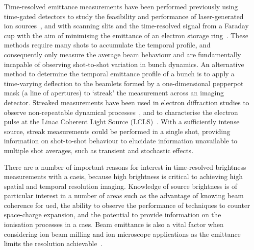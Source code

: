 Time-resolved emittance measurements have been performed previously using time-gated detectors to study the feasibility and performance of laser-generated ion sources~\cite{collier_cern_1996,yoshida_simple_2001}, and with scanning slits and the time-resolved signal from a Faraday cup with the aim of minimising the emittance of an electron storage ring~\cite{walter_time_2003}.
These methods require many shots to accumulate the temporal profile, and consequently only measure the average beam behaviour and are fundamentally incapable of observing shot-to-shot variation in bunch dynamics.
An alternative method to determine the temporal emittance profile of a bunch is to apply a time-varying deflection to the beamlets formed by a one-dimensional pepperpot mask (a line of apertures) to `streak' the measurement across an imaging detector.
Streaked measurements have been used in electron diffraction studies to observe non-repeatable dynamical processes~\cite{li_note:_2010, mukojima_streak-camera_2015}, and to characterise the electron pulse at the Linac Coherent Light Source (LCLS)~\cite{ratner_time-resolved_2015}.
With a sufficiently intense source, streak measurements could be performed in a single shot, providing information on shot-to-shot behaviour to elucidate information unavailable to multiple shot averages, such as transient and stochastic effects.

There are a number of important reasons for interest in time-resolved brightness measurements with a \gls{caeis}, because high brightness is critical to achieving high spatial and temporal resolution imaging.
Knowledge of source brightness is of particular interest in a number of areas such as the advantage of knowing beam coherence for \gls{ued}, the ability to observe the performance of techniques to counter space-charge expansion, and the potential to provide information on the ionisation processes in a \gls{caes}.
Beam emittance is also a vital factor when considering ion beam milling and ion microscope applications as the emittance limits the resolution achievable~\cite{scipioni_helium_2008,khizroev_focused-ion-beam-based_2004}.

